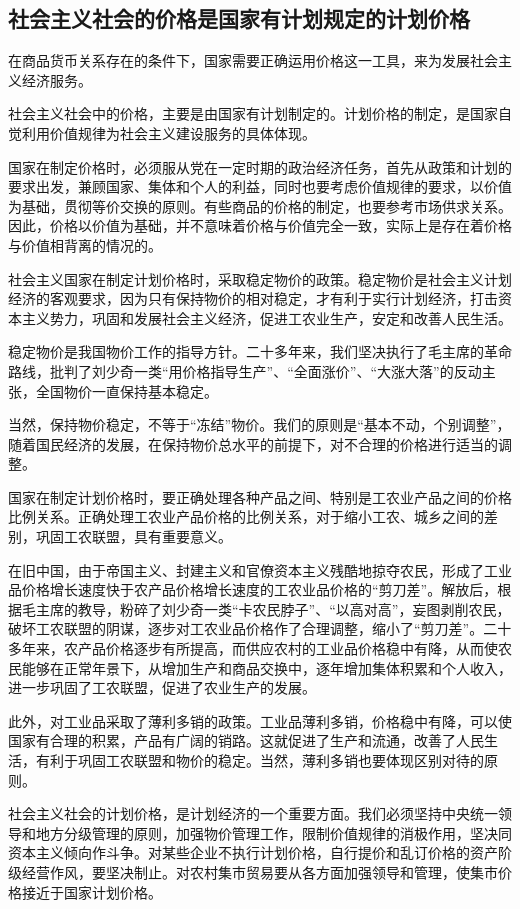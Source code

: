 \documentclass{book}
\begin{document}
\subsection{社会主义社会的价格是国家有计划规定的计划价格}

在商品货币关系存在的条件下，国家需要正确运用价格这一工具，来为发展社会主义经济服务。

社会主义社会中的价格，主要是由国家有计划制定的。计划价格的制定，是国家自觉利用价值规律为社会主义建设服务的具体体现。

国家在制定价格时，必须服从党在一定时期的政治经济任务，首先从政策和计划的要求出发，兼顾国家、集体和个人的利益，同时也要考虑价值规律的要求，以价值为基础，贯彻等价交换的原则。有些商品的价格的制定，也要参考市场供求关系。因此，价格以价值为基础，并不意味着价格与价值完全一致，实际上是存在着价格与价值相背离的情况的。

社会主义国家在制定计划价格时，采取稳定物价的政策。稳定物价是社会主义计划经济的客观要求，因为只有保持物价的相对稳定，才有利于实行计划经济，打击资本主义势力，巩固和发展社会主义经济，促进工农业生产，安定和改善人民生活。

稳定物价是我国物价工作的指导方针。二十多年来，我们坚决执行了毛主席的革命路线，批判了刘少奇一类“用价格指导生产”、“全面涨价”、“大涨大落”的反动主张，全国物价一直保持基本稳定。

当然，保持物价稳定，不等于“冻结”物价。我们的原则是“基本不动，个别调整”，随着国民经济的发展，在保持物价总水平的前提下，对不合理的价格进行适当的调整。

国家在制定计划价格时，要正确处理各种产品之间、特别是工农业产品之间的价格比例关系。正确处理工农业产品价格的比例关系，对于缩小工农、城乡之间的差别，巩固工农联盟，具有重要意义。

在旧中国，由于帝国主义、封建主义和官僚资本主义残酷地掠夺农民，形成了工业品价格增长速度快于农产品价格增长速度的工农业品价格的“剪刀差”。解放后，根据毛主席的教导，粉碎了刘少奇一类“卡农民脖子”、“以高对高”，妄图剥削农民，破坏工农联盟的阴谋，逐步对工农业品价格作了合理调整，缩小了“剪刀差”。二十多年来，农产品价格逐步有所提高，而供应农村的工业品价格稳中有降，从而使农民能够在正常年景下，从增加生产和商品交换中，逐年增加集体积累和个人收入，进一步巩固了工农联盟，促进了农业生产的发展。

此外，对工业品采取了薄利多销的政策。工业品薄利多销，价格稳中有降，可以使国家有合理的积累，产品有广阔的销路。这就促进了生产和流通，改善了人民生活，有利于巩固工农联盟和物价的稳定。当然，薄利多销也要体现区别对待的原则。

社会主义社会的计划价格，是计划经济的一个重要方面。我们必须坚持中央统一领导和地方分级管理的原则，加强物价管理工作，限制价值规律的消极作用，坚决同资本主义倾向作斗争。对某些企业不执行计划价格，自行提价和乱订价格的资产阶级经营作风，要坚决制止。对农村集市贸易要从各方面加强领导和管理，使集市价格接近于国家计划价格。
\end{document}
